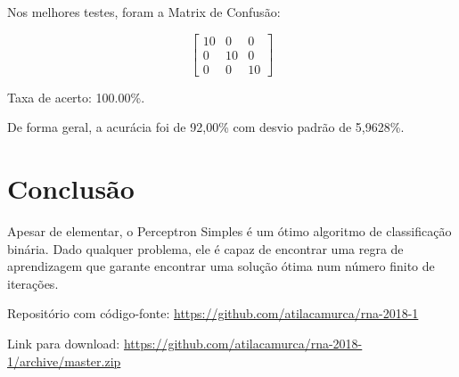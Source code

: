 Nos melhores testes, foram a Matrix de Confusão:

\[
\begin{bmatrix}
10 & 0 & 0 \\
0 & 10 & 0 \\
0 & 0 & 10
\end{bmatrix}
\]

Taxa de acerto: 100.00\%.

De forma geral, a acurácia foi de 92,00\% com desvio padrão de 5,9628\%.

\section{Conclusão}

Apesar de elementar, o Perceptron Simples é um ótimo algoritmo de
classificação binária. Dado qualquer problema, ele é capaz de encontrar
uma regra de aprendizagem que garante encontrar uma solução ótima num
número finito de iterações.

Repositório com código-fonte:
\url{https://github.com/atilacamurca/rna-2018-1}

Link para download:
\url{https://github.com/atilacamurca/rna-2018-1/archive/master.zip}
